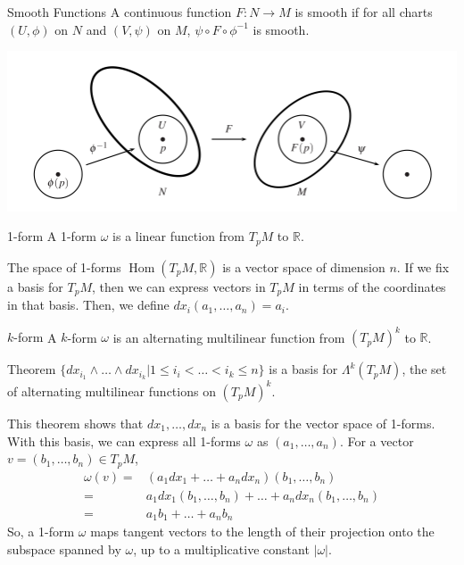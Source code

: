 \documentclass[9pt]{beamer}
\DeclareMathOperator{\Hom}{Hom}
\begin{document}
\begin{frame}
    \begin{block}{Smooth Functions}
        A continuous function $F:N\rightarrow M$ is smooth if for all charts $(U, \phi)$ on $N$ and $(V, \psi)$ on $M$, $\psi\circ F\circ \phi^{-1}$ is smooth.
    \end{block}
    \includegraphics[scale=0.55]{smooth_function.PNG}
\end{frame}

\begin{frame}
    \begin{block}{1-form}
        A 1-form $\omega$ is a linear function from $T_p M$ to $\mathbb{R}$.
    \end{block}
    The space of 1-forms $\Hom(T_p M, \mathbb{R})$ is a vector space of dimension $n$. If we fix a basis for $T_pM$, then we can express vectors in $T_pM$ in terms of the coordinates in that basis. Then, we define $dx_i(a_1, \dots, a_n) = a_i$.
    \begin{block}{$k$-form}
        A $k$-form $\omega$ is an alternating multilinear function from $(T_p M)^k$ to $\mathbb{R}$.
    \end{block}
\end{frame}

\begin{frame}
    \begin{block}{Theorem}
        $\{dx_{i_1}\wedge\dots\wedge dx_{i_k}|1\leq i_i<\dots<i_k\leq n\}$ is a basis for $\Lambda^k(T_pM)$, the set of alternating multilinear functions on $(T_pM)^k$.
    \end{block}
    This theorem shows that $dx_1, \dots, dx_n$ is a basis for the vector space of 1-forms. With this basis, we can express all 1-forms $\omega$ as $(a_1, \dots, a_n)$. For a vector $v=(b_1, \dots, b_n)\in T_pM$, \begin{align*}\omega(v)=&(a_1dx_1+\dots+a_ndx_n)(b_1,\dots,b_n)\\
        =&a_1dx_1(b_1, \dots, b_n)+\dots+a_ndx_n(b_1, \dots, b_n)\\
        =&a_1b_1+\dots+a_nb_n
    \end{align*}
    So, a 1-form $\omega$ maps tangent vectors to the length of their projection onto the subspace spanned by $\omega$, up to a multiplicative constant $|\omega|$.
\end{frame}
\end{document}
